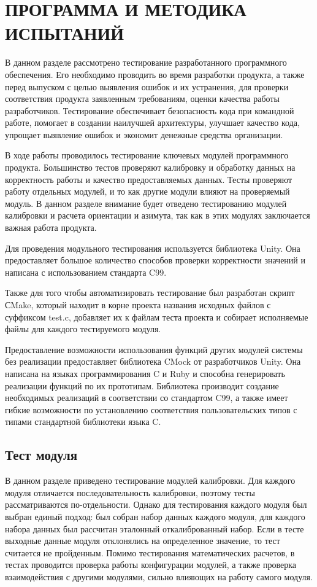 \section{ПРОГРАММА И МЕТОДИКА ИСПЫТАНИЙ}
\label{sec:testing}

В данном разделе рассмотрено тестирование разработанного программного обеспечения.
Его необходимо проводить во время разработки продукта, а также перед выпуском
с целью выявления ошибок и их устранения, для проверки соответствия продукта
заявленным требованиям, оценки качества работы разработчиков. Тестирование
обеспечивает безопасность кода при командной работе, помогает в создании наилучшей
архитектуры, улучшает качество кода, упрощает выявление ошибок и экономит денежные
средства организации.

В ходе работы проводилось тестирование ключевых модулей программного продукта. 
Большинство тестов проверяют калибровку и обработку данных на корректность работы
и качество предоставляемых данных. Тесты проверяют работу отдельных модулей, и то как
другие модули влияют на проверяемый модуль. В данном разделе внимание будет отведено
тестированию модулей калибровки и расчета ориентации и азимута, так как в 
этих модулях заключается важная работа продукта.

Для проведения модульного тестирования используется библиотека Unity. Она предоставляет
большое количество способов проверки корректности значений и написана с использованием
стандарта C99. 

Также для того чтобы автоматизировать тестирование был разработан скрипт
СMake, который находит в корне проекта названия исходных файлов с суффиксом test.c, добавляет их к
файлам теста проекта и собирает исполняемые файлы для каждого тестируемого модуля.

Предоставление возможности использования функций других модулей системы без реализации
предоставляет библиотека CMock от разработчиков Unity. Она написана на языках программирования
C и Ruby и способна генерировать реализации функций по их прототипам. Библиотека
производит создание необходимых реализаций в соответствии со
стандартом C99, а также имеет гибкие
возможности по установлению соответствия пользовательских типов с типами стандартной библиотеки
языка C.

\subsection{Тест модуля \moduleCalib}

В данном разделе приведено тестирование модулей калибровки. Для каждого модуля отличается
последовательность калибровки, поэтому тесты рассматриваются по-отдельности. 
Однако для тестирования каждого модуля был выбран единый подход:
был собран набор данных каждого модуля, для каждого набора данных был рассчитан эталонный откалиброванный набор.
Если в тесте выходные данные модуля отклонялись на определенное значение, то тест считается не пройденным.
Помимо тестирования математических расчетов, в тестах проводится проверка работы конфигурации модулей,
а также проверка взаимодействия с другими модулями, сильно влияющих на работу самого модуля.

